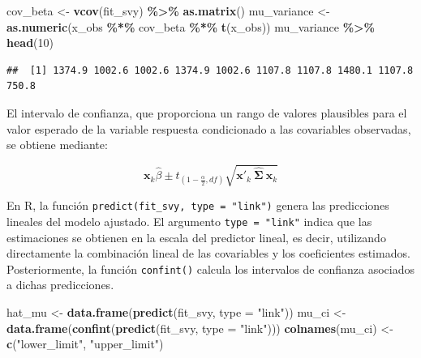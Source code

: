 \documentclass[
  spanish,
  12pt,
]{book}
\newenvironment{Shaded}{\begin{snugshade}}{\end{snugshade}}
\newcommand{\AttributeTok}[1]{\textcolor[rgb]{0.13,0.29,0.53}{#1}}
\newcommand{\DecValTok}[1]{\textcolor[rgb]{0.00,0.00,0.81}{#1}}
\newcommand{\FunctionTok}[1]{\textcolor[rgb]{0.13,0.29,0.53}{\textbf{#1}}}
\newcommand{\NormalTok}[1]{#1}
\newcommand{\OtherTok}[1]{\textcolor[rgb]{0.56,0.35,0.01}{#1}}
\newcommand{\SpecialCharTok}[1]{\textcolor[rgb]{0.81,0.36,0.00}{\textbf{#1}}}
\newcommand{\StringTok}[1]{\textcolor[rgb]{0.31,0.60,0.02}{#1}}
\begin{document}
\begin{Shaded}
\begin{Highlighting}[]
\NormalTok{cov\_beta }\OtherTok{\textless{}{-}} \FunctionTok{vcov}\NormalTok{(fit\_svy) }\SpecialCharTok{\%\textgreater{}\%}
  \FunctionTok{as.matrix}\NormalTok{()}
\NormalTok{mu\_variance }\OtherTok{\textless{}{-}} \FunctionTok{as.numeric}\NormalTok{(x\_obs }\SpecialCharTok{\%*\%}\NormalTok{ cov\_beta }\SpecialCharTok{\%*\%} \FunctionTok{t}\NormalTok{(x\_obs))}
\NormalTok{mu\_variance }\SpecialCharTok{\%\textgreater{}\%}
  \FunctionTok{head}\NormalTok{(}\DecValTok{10}\NormalTok{)}
\end{Highlighting}
\end{Shaded}

\begin{verbatim}
##  [1] 1374.9 1002.6 1002.6 1374.9 1002.6 1107.8 1107.8 1480.1 1107.8  750.8
\end{verbatim}

El intervalo de confianza, que proporciona un rango de valores plausibles para el valor esperado de la variable respuesta condicionado a las covariables observadas, se obtiene mediante:

\[
\mathbf{x}_{k}\hat{\beta}\pm t_{\left(1-\frac{\alpha}{2},df\right)}\sqrt{\mathbf{x}'_{k} \
\hat{\boldsymbol{\Sigma}} \
\mathbf{x}_{k}}
\]

En R, la función \texttt{predict(fit\_svy,\ type\ =\ "link")} genera las predicciones lineales del modelo ajustado. El argumento \texttt{type\ =\ "link"} indica que las estimaciones se obtienen en la escala del predictor lineal, es decir, utilizando directamente la combinación lineal de las covariables y los coeficientes estimados. Posteriormente, la función \texttt{confint()} calcula los intervalos de confianza asociados a dichas predicciones.

\begin{Shaded}
\begin{Highlighting}[]
\NormalTok{hat\_mu }\OtherTok{\textless{}{-}} \FunctionTok{data.frame}\NormalTok{(}\FunctionTok{predict}\NormalTok{(fit\_svy, }\AttributeTok{type =} \StringTok{"link"}\NormalTok{))}
\NormalTok{mu\_ci }\OtherTok{\textless{}{-}} \FunctionTok{data.frame}\NormalTok{(}\FunctionTok{confint}\NormalTok{(}\FunctionTok{predict}\NormalTok{(fit\_svy, }\AttributeTok{type =} \StringTok{"link"}\NormalTok{)))}
\FunctionTok{colnames}\NormalTok{(mu\_ci) }\OtherTok{\textless{}{-}} \FunctionTok{c}\NormalTok{(}\StringTok{"lower\_limit"}\NormalTok{, }\StringTok{"upper\_limit"}\NormalTok{)}
\end{Highlighting}
\end{Shaded}
\end{document}
